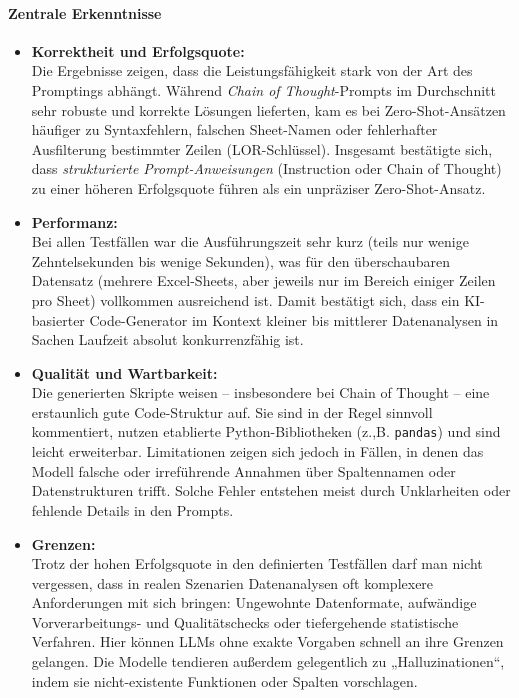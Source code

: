 \documentclass[11pt,a4paper]{article}
\begin{document}
\paragraph{Zentrale Erkenntnisse}
\begin{itemize}
    \item \textbf{Korrektheit und Erfolgsquote:}\\Die Ergebnisse zeigen, dass die Leistungsfähigkeit stark von der Art des Promptings abhängt. Während \emph{Chain of Thought}-Prompts im Durchschnitt sehr robuste und korrekte Lösungen lieferten, kam es bei Zero-Shot-Ansätzen häufiger zu Syntaxfehlern, falschen Sheet-Namen oder fehlerhafter Ausfilterung bestimmter Zeilen (LOR-Schlüssel). Insgesamt bestätigte sich, dass \emph{strukturierte Prompt-Anweisungen} (Instruction oder Chain of Thought) zu einer höheren Erfolgsquote führen als ein unpräziser Zero-Shot-Ansatz.
    \item \textbf{Performanz:}\\Bei allen Testfällen war die Ausführungszeit sehr kurz (teils nur wenige Zehntelsekunden bis wenige Sekunden), was für den überschaubaren Datensatz (mehrere Excel-Sheets, aber jeweils nur im Bereich einiger Zeilen pro Sheet) vollkommen ausreichend ist. Damit bestätigt sich, dass ein KI-basierter Code-Generator im Kontext kleiner bis mittlerer Datenanalysen in Sachen Laufzeit absolut konkurrenzfähig ist.
    \item \textbf{Qualität und Wartbarkeit:}\\Die generierten Skripte weisen – insbesondere bei Chain of Thought – eine erstaunlich gute Code-Struktur auf. Sie sind in der Regel sinnvoll kommentiert, nutzen etablierte Python-Bibliotheken (z.,B. \texttt{pandas}) und sind leicht erweiterbar. Limitationen zeigen sich jedoch in Fällen, in denen das Modell falsche oder irreführende Annahmen über Spaltennamen oder Datenstrukturen trifft. Solche Fehler entstehen meist durch Unklarheiten oder fehlende Details in den Prompts.
    \item \textbf{Grenzen:}\\Trotz der hohen Erfolgsquote in den definierten Testfällen darf man nicht vergessen, dass in realen Szenarien Datenanalysen oft komplexere Anforderungen mit sich bringen: Ungewohnte Datenformate, aufwändige Vorverarbeitungs- und Qualitätschecks oder tiefergehende statistische Verfahren. Hier können LLMs ohne exakte Vorgaben schnell an ihre Grenzen gelangen. Die Modelle tendieren außerdem gelegentlich zu „Halluzinationen“, indem sie nicht-existente Funktionen oder Spalten vorschlagen.
\end{itemize}
\end{document}
